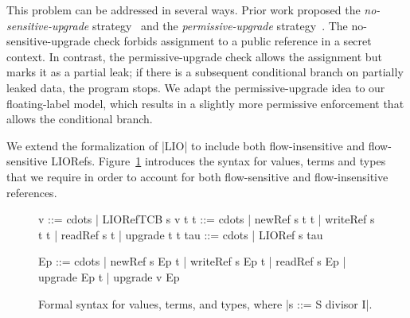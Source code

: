 This problem can be addressed in several ways. Prior work proposed the
\emph{no-sensitive-upgrade} strategy~\citep{?} and the
\emph{permissive-upgrade} strategy~\citep{?}. The no-sensitive-upgrade
check forbids assignment to a public reference in a secret context. In
contrast, the permissive-upgrade check allows the assignment but marks
it as a partial leak; if there is a subsequent conditional branch on
partially leaked data, the program stops. We adapt the
permissive-upgrade idea to our floating-label model, which results in
a slightly more permissive enforcement that allows the conditional
branch.

We extend the formalization of |LIO| to include both flow-insensitive
and flow-sensitive LIORefs. Figure~\ref{fig:fs-exts-syntax} introduces
the syntax for values, terms and types that we require in order to
account for both flow-sensitive and flow-insensitive references.

\begin{figure}[!ht] %
\centering
\begin{code}
v   ::= cdots  | LIORefTCB s v t
t   ::= cdots  | newRef s t t | writeRef s t t 
               | readRef s t | upgrade t t
tau ::= cdots  | LIORef s tau


Ep   ::= cdots  | newRef s Ep t | writeRef s Ep t 
                | readRef s Ep | upgrade Ep t | upgrade v Ep
\end{code}
\caption{Formal syntax for values, terms, and types,
where |s  ::=  S  divisor I|.\label{fig:fs-exts-syntax}}
\vspace*{-5pt}
\end{figure} 

